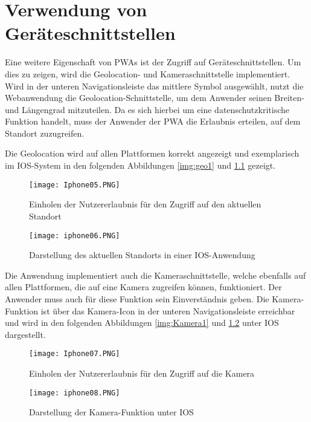 \chapter{Verwendung von Geräteschnittstellen}

Eine weitere Eigenschaft von PWAs ist der Zugriff auf Geräteschnittstellen. Um dies zu zeigen, wird die Geolocation- und Kameraschnittstelle implementiert.
Wird in der unteren Navigationsleiste das mittlere Symbol ausgewählt, nutzt die Webanwendung die Geolocation-Schnittstelle, um dem Anwender seinen Breiten- und Längengrad mitzuteilen. Da es sich hierbei um eine datenschutzkritische Funktion handelt, muss der Anwender der PWA die Erlaubnis erteilen, auf dem Standort zuzugreifen. 

Die Geolocation wird auf allen Plattformen korrekt angezeigt und exemplarisch im IOS-System in den folgenden Abbildungen \ref{img:geo1} und \ref{img:geo2} gezeigt. 

\begin{figure}[!htb]
    \begin{minipage}[b]{.4\linewidth} %
       \texttt{[image: Iphone05.PNG]}
       \caption{Einholen der Nutzererlaubnis für den Zugriff auf den aktuellen Standort}
       \label{img:geo1}
    \end{minipage}
    \hspace{.1\linewidth}%
    \begin{minipage}[b]{.4\linewidth} %
       \texttt{[image: iphone06.PNG]}
       \caption{Darstellung des aktuellen Standorts in einer IOS-Anwendung}
       \label{img:geo2}
    \end{minipage}
 \end{figure}

 Die Anwendung implementiert auch die Kameraschnittstelle, welche ebenfalls auf allen Plattformen, die auf eine Kamera zugreifen können, funktioniert. Der Anwender muss auch für diese Funktion sein Einverständnis geben. Die Kamera-Funktion ist über das Kamera-Icon in der unteren Navigationsleiste erreichbar und wird in den folgenden Abbildungen \ref{img:Kamera1} und \ref{img:Kamera2} unter IOS dargestellt.

 \begin{figure}[!htb]
    \begin{minipage}[b]{.4\linewidth} %
       \texttt{[image: Iphone07.PNG]}
       \caption{Einholen der Nutzererlaubnis für den Zugriff auf die Kamera}
       \label{img:Kamera1}
    \end{minipage}
    \hspace{.1\linewidth}%
    \begin{minipage}[b]{.4\linewidth} %
       \texttt{[image: iphone08.PNG]}
       \caption{Darstellung der Kamera-Funktion unter IOS}
       \label{img:Kamera2}
    \end{minipage}
 \end{figure}


